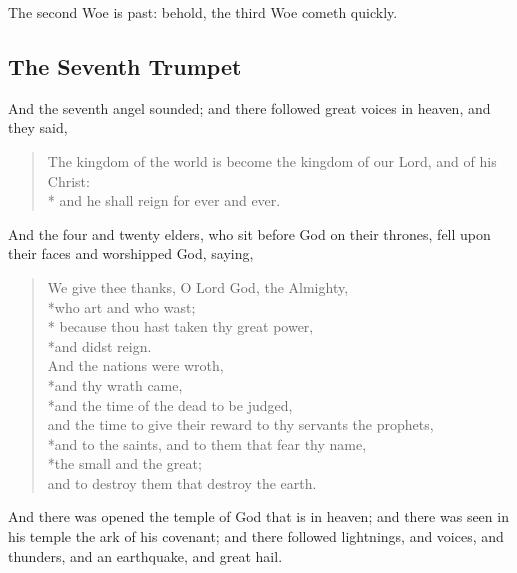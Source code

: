  The second Woe is past: behold, the third Woe cometh quickly.
\subsection*{The Seventh Trumpet}
 And the seventh angel sounded; and there followed great voices in heaven, and they said,
\begin{verse}
The kingdom of the world is become the kingdom of our Lord, and of his Christ:\\* and he shall reign for ever and ever.
\end{verse}
 And the four and twenty elders, who sit before God on their thrones, fell upon their faces and worshipped God, 
 saying,
\begin{verse}
We give thee thanks, O Lord God, the Almighty,\\*\vin who art and who wast;\\* because thou hast taken thy great power,\\*\vin and didst reign.\\ 
And the nations were wroth,\\*\vin and thy wrath came,\\*\vin and the time of the dead to be judged,\\ and the time to give their reward to thy servants the prophets,\\*\vin and to the saints, and to them that fear thy name,\\*\vin the small and the great;\\ and to destroy them that destroy the earth.
\end{verse}
 And there was opened the temple of God that is in heaven; and there was seen in his temple the ark of his covenant; and there followed lightnings, and voices, and thunders, and an earthquake, and great hail.